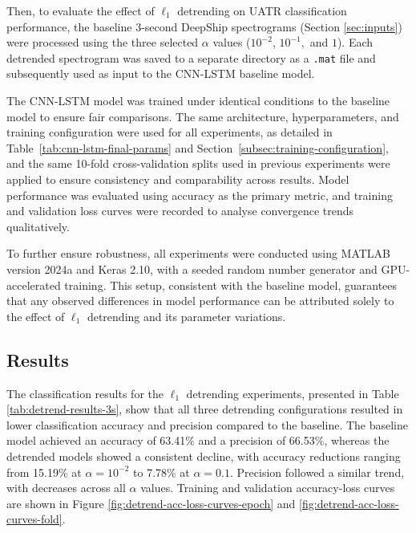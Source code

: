 Then, to evaluate the effect of $\ell_1$ detrending on UATR classification performance, the baseline 3-second DeepShip spectrograms (Section \ref{sec:inputs}) were processed using the three selected $\alpha$ values ($10^{-2}$, $10^{-1},$ and $1$). Each detrended spectrogram was saved to a separate directory as a \texttt{.mat} file and subsequently used as input to the CNN-LSTM baseline model.

The CNN-LSTM model was trained under identical conditions to the baseline model to ensure fair comparisons. The same architecture, hyperparameters, and training configuration were used for all experiments, as detailed in Table~\ref{tab:cnn-lstm-final-params} and Section~\ref{subsec:training-configuration}, and the same 10-fold cross-validation splits used in previous experiments were applied to ensure consistency and comparability across results.  Model performance was evaluated using accuracy as the primary metric, and training and validation loss curves were recorded to analyse convergence trends qualitatively.

To further ensure robustness, all experiments were conducted using MATLAB version 2024a and Keras 2.10, with a seeded random number generator and GPU-accelerated training. This setup, consistent with the baseline model, guarantees that any observed differences in model performance can be attributed solely to the effect of $\ell_1$ detrending and its parameter variations.

\subsection{Results}

The classification results for the $\ell_1$ detrending experiments, presented in Table \ref{tab:detrend-results-3s}, show that all three detrending configurations resulted in lower classification accuracy and precision compared to the baseline. The baseline model achieved an accuracy of 63.41\% and a precision of 66.53\%, whereas the detrended models showed a consistent decline, with accuracy reductions ranging from 15.19\% at $\alpha = 10^{-2}$ to 7.78\% at $\alpha = 0.1$. Precision followed a similar trend, with decreases across all $\alpha$ values. Training and validation accuracy-loss curves are shown in Figure \ref{fig:detrend-acc-loss-curves-epoch} and \ref{fig:detrend-acc-loss-curves-fold}.

